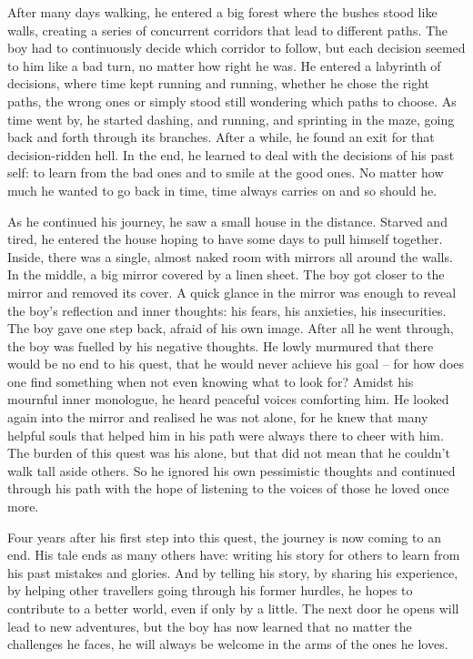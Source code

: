 After many days walking, he entered a big forest where the bushes stood like walls, creating a series of concurrent corridors that lead to different paths. The boy had to continuously decide which corridor to follow, but each decision seemed to him like a bad turn, no matter how right he was. He entered a labyrinth of decisions, where time kept running and running, whether he chose the right paths, the wrong ones or simply stood still wondering which paths to choose. As time went by, he started dashing, and running, and sprinting in the maze, going back and forth through its branches. After a while, he found an exit for that decision-ridden hell. In the end, he learned to deal with the decisions of his past self: to learn from the bad ones and to smile at the good ones. No matter how much he wanted to go back in time, time always carries on and so should he.

As he continued his journey, he saw a small house in the distance. Starved and tired, he entered the house hoping to have some days to pull himself together. Inside, there was a single, almost naked room with mirrors all around the walls. In the middle, a big mirror covered by a linen sheet. The boy got closer to the mirror and removed its cover. A quick glance in the mirror was enough to reveal the boy's reflection and inner thoughts: his fears, his anxieties, his insecurities. The boy gave one step back, afraid of his own image. After all he went through, the boy was fuelled by his negative thoughts. He lowly murmured that there would be no end to his quest, that he would never achieve his goal -- for how does one find something when not even knowing what to look for? Amidst his mournful inner monologue, he heard peaceful voices comforting him. He looked again into the mirror and realised he was not alone, for he knew that many helpful souls that helped him in his path were always there to cheer with him. The burden of this quest was his alone, but that did not mean that he couldn't walk tall aside others. So he ignored his own pessimistic thoughts and continued through his path with the hope of listening to the voices of those he loved once more.

Four years after his first step into this quest, the journey is now coming to an end. His tale ends as many others have: writing his story for others to learn from his past mistakes and glories. And by telling his story, by sharing his experience, by helping other travellers going through his former hurdles, he hopes to contribute to a better world, even if only by a little. The next door he opens will lead to new adventures, but the boy has now learned that no matter the challenges he faces, he will always be welcome in the arms of the ones he loves.
